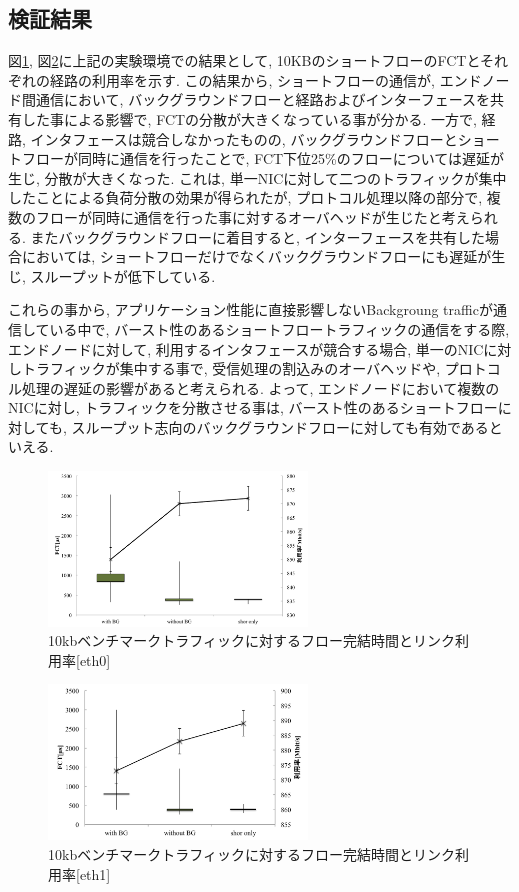 \documentclass[11pt, a4paper, twocolumn]{jsarticle}
\begin{document}
\subsection{検証結果}
図\ref{fig:real_exp0}, 図\ref{fig:real_exp1}に上記の実験環境での結果として,
10KBのショートフローのFCTとそれぞれの経路の利用率を示す.
この結果から, ショートフローの通信が, エンドノード間通信において, バックグラウンドフローと経路およびインターフェースを共有した事による影響で,
FCTの分散が大きくなっている事が分かる.
一方で, 経路, インタフェースは競合しなかったものの, バックグラウンドフローとショートフローが同時に通信を行ったことで,
FCT下位25\%のフローについては遅延が生じ, 分散が大きくなった.
これは, 単一NICに対して二つのトラフィックが集中したことによる負荷分散の効果が得られたが, プロトコル処理以降の部分で,
複数のフローが同時に通信を行った事に対するオーバヘッドが生じたと考えられる.
またバックグラウンドフローに着目すると, インターフェースを共有した場合においては,
ショートフローだけでなくバックグラウンドフローにも遅延が生じ, スループットが低下している.

これらの事から, アプリケーション性能に直接影響しないBackgroung trafficが通信している中で,
バースト性のあるショートフロートラフィックの通信をする際, エンドノードに対して, 利用するインタフェースが競合する場合,
単一のNICに対しトラフィックが集中する事で, 受信処理の割込みのオーバヘッドや, プロトコル処理の遅延の影響があると考えられる.
よって, エンドノードにおいて複数のNICに対し, トラフィックを分散させる事は, バースト性のあるショートフローに対しても,
スループット志向のバックグラウンドフローに対しても有効であるといえる.

\begin{figure}[h]
    \begin{center}
    \includegraphics[autoebb, width=195pt]{./img/real_eth0.pdf}
    \caption{10kbベンチマークトラフィックに対するフロー完結時間とリンク利用率[eth0]}
    \label{fig:real_exp0}
    \end{center}
\end{figure}

\begin{figure}[h]
    \begin{center}
    \includegraphics[autoebb, width=195pt]{./img/real_eth1.pdf}
    \caption{10kbベンチマークトラフィックに対するフロー完結時間とリンク利用率[eth1]}
    \label{fig:real_exp1}
    \end{center}
\end{figure}
\end{document}
